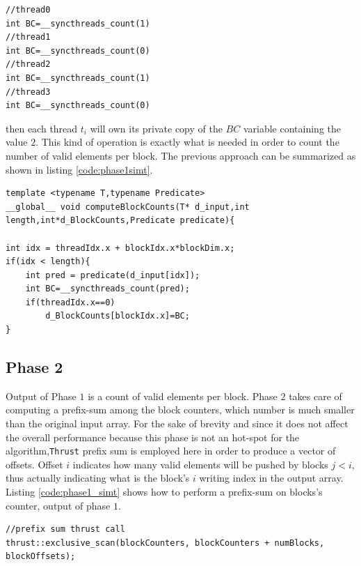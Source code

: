 \begin{lstlisting}
//thread0
int BC=__syncthreads_count(1)
//thread1
int BC=__syncthreads_count(0)
//thread2
int BC=__syncthreads_count(1)
//thread3
int BC=__syncthreads_count(0)
\end{lstlisting}
then each thread \(t_i\) will own its private copy of the \(BC\) variable containing the value $2$.
This kind of operation is exactly what is needed in order to count the number of valid elements per block.
The previous approach can be summarized as shown in listing \ref{code:phase1simt}.
\begin{lstlisting}
template <typename T,typename Predicate>
__global__ void computeBlockCounts(T* d_input,int length,int*d_BlockCounts,Predicate predicate){

int idx = threadIdx.x + blockIdx.x*blockDim.x;
if(idx < length){
	int pred = predicate(d_input[idx]);
	int BC=__syncthreads_count(pred);
	if(threadIdx.x==0)
		d_BlockCounts[blockIdx.x]=BC;
}
\end{lstlisting}

\subsection{Phase 2}
Output of Phase $1$ is a count of valid elements per block. 
Phase $2$ takes care of computing a prefix-sum among the block counters, which number is much smaller than the original input array.
For the sake of brevity and since it does not affect the overall performance because this phase is not an hot-spot for the algorithm,\texttt{Thrust} prefix sum is employed here in order to produce a vector of offsets. Offset $i$ indicates how many valid elements will be pushed by blocks $j < i$, thus actually indicating what is the block's $i$ writing index in the output array.
Listing \ref{code:phase1_simt} shows how to perform a prefix-sum on blocks's counter, output of phase $1$.
\begin{lstlisting}
//prefix sum thrust call
thrust::exclusive_scan(blockCounters, blockCounters + numBlocks, blockOffsets);
\end{lstlisting}

